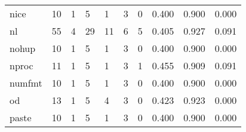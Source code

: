 \begin{longtable}{lp{1.3cm}p{1.3cm}p{1.3cm}p{1.3cm}p{1.3cm}p{1.3cm}p{1.3cm}p{1.3cm}p{1.3cm}}
nice      &                     10 &                                             1 &                                            5 &                                           1 &                                            3 &                                          0 &                                0.400 &                                  0.900 &                                0.000 \\
nl        &                     55 &                                             4 &                                           29 &                                          11 &                                            6 &                                          5 &                                0.405 &                                  0.927 &                                0.091 \\
nohup     &                     10 &                                             1 &                                            5 &                                           1 &                                            3 &                                          0 &                                0.400 &                                  0.900 &                                0.000 \\
nproc     &                     11 &                                             1 &                                            5 &                                           1 &                                            3 &                                          1 &                                0.455 &                                  0.909 &                                0.091 \\
numfmt    &                     10 &                                             1 &                                            5 &                                           1 &                                            3 &                                          0 &                                0.400 &                                  0.900 &                                0.000 \\
od        &                     13 &                                             1 &                                            5 &                                           4 &                                            3 &                                          0 &                                0.423 &                                  0.923 &                                0.000 \\
paste     &                     10 &                                             1 &                                            5 &                                           1 &                                            3 &                                          0 &                                0.400 &                                  0.900 &                                0.000 \\

\end{longtable}
